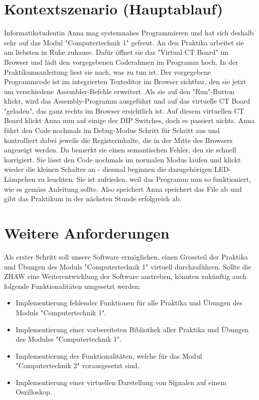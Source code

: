 \documentclass[10pt]{article}
\begin{document}
\section{Kontextszenario (Hauptablauf)}

Informatikstudentin Anna mag systemnahes Programmieren und hat sich deshalb sehr auf das Modul "Computertechnik 1" gefreut. An den Praktika arbeitet sie am liebsten in Ruhe zuhause. Dafür öffnet sie das "Virtual CT Board" im Browser und lädt den vorgegebenen Coderahmen im Programm hoch. In der Praktikumsanleitung liest sie nach, was zu tun ist. Der vorgegebene Programmcode ist im integrierten Texteditor im Browser sichtbar, den sie jetzt um verschiedene Assembler-Befehle erweitert. Als sie auf den "Run"-Button klickt, wird das Assembly-Programm ausgeführt und auf das virtuelle CT Board "geladen", das ganz rechts im Browser ersichtlich ist. 
\newline Auf diesem virtuellen CT Board klickt Anna nun auf einige der DIP Switches, doch es passiert nichts. Anna führt den Code nochmals im Debug-Modus Schritt für Schritt aus und kontrolliert dabei jeweils die Registerinhalte, die in der Mitte des Browsers angezeigt werden. Da bemerkt sie einen semantischen Fehler, den sie schnell korrigiert. Sie lässt den Code nochmals im normalen Modus laufen und klickt wieder die kleinen Schalter an - diesmal beginnen die dazugehörigen LED-Lämpchen zu leuchten. Sie ist zufrieden, weil das Programm nun so funktioniert, wie es gemäss Anleitung sollte. Also speichert Anna speichert das File ab und gibt das Praktikum in der nächsten Stunde erfolgreich ab.

\section{Weitere Anforderungen}
Als erster Schritt soll unsere Software ermöglichen, einen Grossteil der Praktika und Übungen des Moduls "Computertechnik 1" virtuell durchzuführen. Sollte die ZHAW eine Weiterentwicklung der Software anstreben, könnten zukünftig auch folgende Funktionalitäten umgesetzt werden: 
\begin{itemize}
\item Implementierung fehlender Funktionen für alle Praktika und Übungen des Moduls "Computertechnik 1". 
\item Implementierung einer vorbereiteten Bibliothek aller Praktika und Übungen des Modules "Computertechnik 1". 
\item Implementierung der Funktionalitäten, welche für das Modul "Computertechnik 2" vorausgesetzt sind. 
\item Implementierung einer virtuellen Darstellung von Signalen auf einem Oszilloskop.
\end{itemize}
\end{document}
